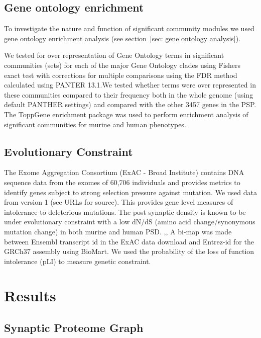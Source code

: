 \subsection{Gene ontology enrichment}
To investigate the nature and function of significant community modules we used gene ontology enrichment analysis (see section~\ref{sec: gene ontology analysis}). \cite{mi2013large}  

 We tested for over representation of Gene Ontology terms in significant communities (sets) for each of the major Gene Ontology clades using Fishers exact test with corrections for multiple comparisons using the FDR method calculated using PANTER 13.1.\cite{mi2013large}We tested whether terms were over represented in these communities compared to their frequency both in the whole genome (using default  PANTHER settings) and compared with the  other 3457 genes in the PSP. \cite{mi2013large}  The ToppGene enrichment package was used to perform enrichment analysis of significant communities for murine and human phenotypes. \cite{chen2009toppgene}  

\subsection{Evolutionary Constraint}

The Exome Aggregation Consortium (ExAC - Broad Institute) contains DNA sequence data from the exomes of 60,706 individuals and provides metrics to identify genes subject to strong selection pressure against mutation. \cite{lek2016analysis}  We used data from version 1 (see URLs for source). This provides gene level measures of intolerance to deleterious mutations. The post synaptic density is known to be under evolutionary constraint with a low dN/dS (amino acid change/synonymous mutation change) in both murine and human PSD. \cite{ryan2009origin},\cite{bayes2012comparative},\cite{bayes2011characterization}  A bi-map was made between Ensembl transcript id in the ExAC data download and Entrez-id for the GRCh37 assembly using BioMart. \cite{smedley2015biomart}  We used the probability of the loss of function intolerance (pLI) to measure genetic constraint.

\section{Results}

\subsection{Synaptic Proteome Graph}

